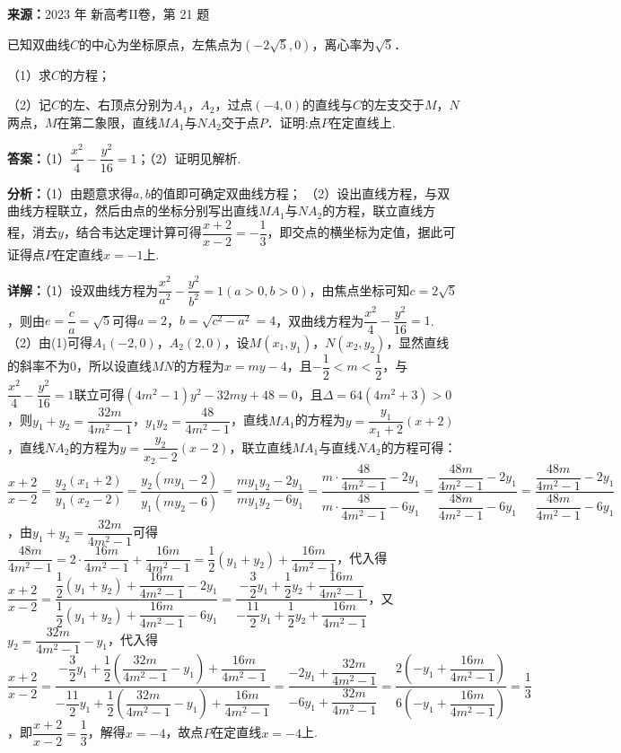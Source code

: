 \begin{question}[points=10]
\textbf{来源：}2023 年 新高考II卷，第 21 题\par
已知双曲线$C$的中心为坐标原点，左焦点为$(-2\sqrt{5},0)$，离心率为$\sqrt{5}$．

（1）求$C$的方程；

（2）记$C$的左、右顶点分别为$A_{1}$，$A_{2}$，过点$(-4,0)$的直线与$C$的左支交于$M$，$N$两点，$M$在第二象限，直线$MA_{1}$与$NA_{2}$交于点$P$．证明:点$P$在定直线上.
\begin{solution}
\textbf{答案：}（1）$\dfrac{x^{2}}{4}-\dfrac{y^{2}}{16}=1$；（2）证明见解析.

\textbf{分析：}（1）由题意求得$a,b$的值即可确定双曲线方程；
（2）设出直线方程，与双曲线方程联立，然后由点的坐标分别写出直线$MA_{1}$与$NA_{2}$的方程，联立直线方程，消去$y$，结合韦达定理计算可得$\dfrac{x+2}{x-2}=-\dfrac{1}{3}$，即交点的横坐标为定值，据此可证得点$P$在定直线$x=-1$上.

\textbf{详解：}（1）设双曲线方程为$\dfrac{x^{2}}{a^{2}}-\dfrac{y^{2}}{b^{2}}=1(a>0,b>0)$，由焦点坐标可知$c=2\sqrt{5}$，则由$e=\dfrac{c}{a}=\sqrt{5}$可得$a=2$，$b=\sqrt{c^{2}-a^{2}}=4$，双曲线方程为$\dfrac{x^{2}}{4}-\dfrac{y^{2}}{16}=1$.
（2）由(1)可得$A_{1}(-2,0)$，$A_{2}(2,0)$，设$M(x_{1},y_{1})$，$N(x_{2},y_{2})$，显然直线的斜率不为$0$，所以设直线$MN$的方程为$x=my-4$，且$-\dfrac{1}{2}<m<\dfrac{1}{2}$，与$\dfrac{x^{2}}{4}-\dfrac{y^{2}}{16}=1$联立可得$(4m^{2}-1)y^{2}-32my+48=0$，且$\Delta=64(4m^{2}+3)>0$，则$y_{1}+y_{2}=\dfrac{32m}{4m^{2}-1}$，$y_{1}y_{2}=\dfrac{48}{4m^{2}-1}$，直线$MA_{1}$的方程为$y=\dfrac{y_{1}}{x_{1}+2}(x+2)$，直线$NA_{2}$的方程为$y=\dfrac{y_{2}}{x_{2}-2}(x-2)$，联立直线$MA_{1}$与直线$NA_{2}$的方程可得：$\dfrac{x+2}{x-2}=\dfrac{y_{2}(x_{1}+2)}{y_{1}(x_{2}-2)}=\dfrac{y_{2}(my_{1}-2)}{y_{1}(my_{2}-6)}=\dfrac{my_{1}y_{2}-2y_{1}}{my_{1}y_{2}-6y_{1}}=\dfrac{m\cdot\dfrac{48}{4m^{2}-1}-2y_{1}}{m\cdot\dfrac{48}{4m^{2}-1}-6y_{1}}=\dfrac{\dfrac{48m}{4m^{2}-1}-2y_{1}}{\dfrac{48m}{4m^{2}-1}-6y_{1}}=\dfrac{\dfrac{48m}{4m^{2}-1}-2y_{1}}{\dfrac{48m}{4m^{2}-1}-6y_{1}}$，由$y_{1}+y_{2}=\dfrac{32m}{4m^{2}-1}$可得$\dfrac{48m}{4m^{2}-1}=2\cdot\dfrac{16m}{4m^{2}-1}+\dfrac{16m}{4m^{2}-1}=\dfrac{1}{2}(y_{1}+y_{2})+\dfrac{16m}{4m^{2}-1}$，代入得$\dfrac{x+2}{x-2}=\dfrac{\dfrac{1}{2}(y_{1}+y_{2})+\dfrac{16m}{4m^{2}-1}-2y_{1}}{\dfrac{1}{2}(y_{1}+y_{2})+\dfrac{16m}{4m^{2}-1}-6y_{1}}=\dfrac{-\dfrac{3}{2}y_{1}+\dfrac{1}{2}y_{2}+\dfrac{16m}{4m^{2}-1}}{-\dfrac{11}{2}y_{1}+\dfrac{1}{2}y_{2}+\dfrac{16m}{4m^{2}-1}}$，又$y_{2}=\dfrac{32m}{4m^{2}-1}-y_{1}$，代入得$\dfrac{x+2}{x-2}=\dfrac{-\dfrac{3}{2}y_{1}+\dfrac{1}{2}(\dfrac{32m}{4m^{2}-1}-y_{1})+\dfrac{16m}{4m^{2}-1}}{-\dfrac{11}{2}y_{1}+\dfrac{1}{2}(\dfrac{32m}{4m^{2}-1}-y_{1})+\dfrac{16m}{4m^{2}-1}}=\dfrac{-2y_{1}+\dfrac{32m}{4m^{2}-1}}{-6y_{1}+\dfrac{32m}{4m^{2}-1}}=\dfrac{2(-y_{1}+\dfrac{16m}{4m^{2}-1})}{6(-y_{1}+\dfrac{16m}{4m^{2}-1})}=\dfrac{1}{3}$，即$\dfrac{x+2}{x-2}=\dfrac{1}{3}$，解得$x=-4$，故点$P$在定直线$x=-4$上.
\end{solution}
\end{question}

